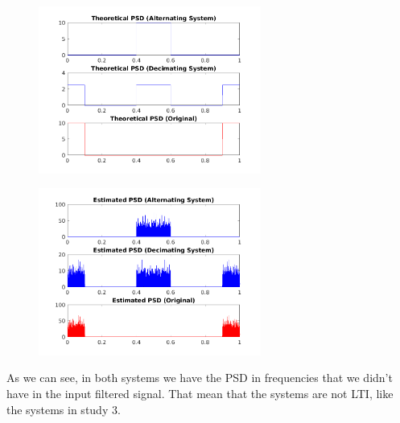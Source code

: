 \documentclass[a4paper,11pt]{article}
\begin{document}
\begin{figure}[!hp]
    \begin{center}
      \includegraphics[width=0.65\textwidth]{images/study4/comp_psd_th.png}
    \end{center}
\end{figure}

\begin{figure}[!hp]
    \begin{center}
      \includegraphics[width=0.65\textwidth]{images/study4/comp_psd_es.png}
    \end{center}
\end{figure}

As we can see, in both systems we have the PSD in frequencies that we didn't
have in the input filtered signal. That mean that the systems are not LTI, like
the systems in study 3.

\vspace{4cm}
\end{document}
